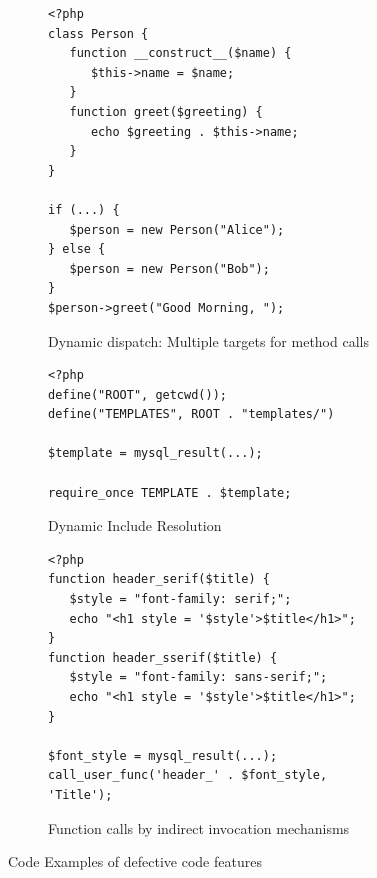 \documentclass[sigconf]{acmart}
\begin{document}
\begin{figure}[t]
	\begin{subfigure}[b]{0.48\textwidth}
	
\begin{lstlisting}
<?php
class Person {
   function __construct__($name) {
      $this->name = $name;
   }
   function greet($greeting) {
      echo $greeting . $this->name;
   }
}

if (...) {
   $person = new Person("Alice");
} else {
   $person = new Person("Bob");
}
$person->greet("Good Morning, ");
\end{lstlisting}
	\caption{
		Dynamic dispatch: Multiple targets for method calls
		\label{fig:multi_target}
	}
	\end{subfigure}
	\vspace{2mm}
	\hfill
	\begin{subfigure}[b]{0.48\textwidth}

\begin{lstlisting}
<?php
define("ROOT", getcwd());
define("TEMPLATES", ROOT . "templates/")

$template = mysql_result(...);

require_once TEMPLATE . $template;
\end{lstlisting}
	\caption{
		Dynamic Include Resolution
		\label{fig:dynamic_includes}
	}
	\end{subfigure}
	\vspace{2mm}
	\hfill
	\begin{subfigure}[b]{0.48\textwidth}

\begin{lstlisting}
<?php
function header_serif($title) {
   $style = "font-family: serif;";
   echo "<h1 style = '$style'>$title</h1>";
}
function header_sserif($title) {
   $style = "font-family: sans-serif;";
   echo "<h1 style = '$style'>$title</h1>";
}

$font_style = mysql_result(...);
call_user_func('header_' . $font_style, 'Title');
\end{lstlisting}
	\caption{
		Function calls by indirect invocation mechanisms
		\label{fig:indirect_calls}
	}
	
	\end{subfigure}
	\caption{
		Code Examples of defective code features
		\label{fig:defective_code_features}
	}
\end{figure}
\end{document}
